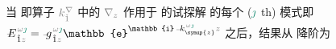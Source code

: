 当  即算子 $\mathcolor{gray}{k^\nabla_{\check{1}}}$ 中的 $\mathcolor{gray}{\nabla_z}$ 作用于  的试探解  的\textcolor{PineGreen}{每个 ($\textcolor{PineGreen}{\jmath}$ th) 模式}即 $
\xint{\mathcolor{gray}{-}}{25}{E}^{\;\!\mathcolor{gray}{\omega} \textcolor{PineGreen}{\jmath}}_{\;\! \hat{1} \mathcolor{gray}{z}} = \xint{{}^{}_{\mathcolor{gray}{-}}}{10}{g}^{\;\!\mathcolor{gray}{\omega} \textcolor{PineGreen}{\jmath}}_{\;\! \hat{1} \mathcolor{gray}{z}} \mathbb{e}^{\mathbb{i} \xint{\begin{smallmatrix} ~ \\ {}^{}_{\mathcolor{gray}{-}} \\ ~ \end{smallmatrix}}{15}{k}_{\symup{z}}^{\;\! \mathcolor{gray}{\omega} \textcolor{PineGreen}{\jmath}} \mathcolor{gray}{z}}$ 之后，结果从  降阶为
